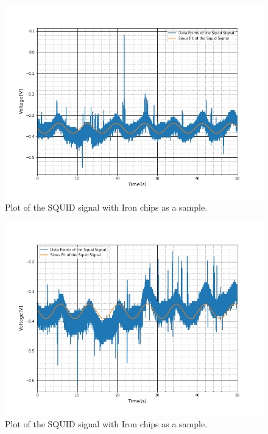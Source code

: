 \begin{figure}[ht]
	\includegraphics[scale=0.5]{Bild/P1_1}
	\centering
	\caption[SQUID signal of Iron Chips 1]{Plot of the SQUID signal with Iron chips as a sample.}
\end{figure}
\begin{figure}[ht]
	\includegraphics[scale=0.5]{Bild/P1_2}
	\centering
	\caption[SQUID signal of Iron Chips 2]{Plot of the SQUID signal with Iron chips as a sample.}
\end{figure}
